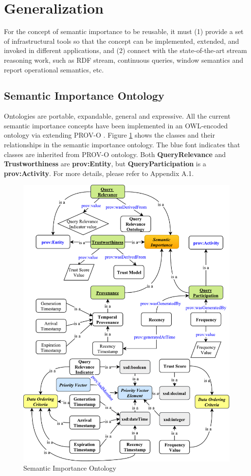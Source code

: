 \section{Generalization}
For the concept of semantic importance to be reusable, it must 
(1) provide a set of infrastructural tools so that the concept can be implemented, extended, and invoked in different applications, 
and (2) connect with the state-of-the-art stream reasoning work, such as RDF stream, continuous queries, window semantics and report operational semantics, etc.
%
\subsection{Semantic Importance Ontology}
Ontologies are portable, expandable, general and expressive.
All the current semantic importance concepts have been implemented in an OWL-encoded ontology via extending PROV-O \cite{lebo2013prov}.
Figure \ref{fig:6-sicr} shows the classes and their relationships in the semantic importance ontology. 
The blue font indicates that classes are inherited from PROV-O ontology. 
Both \textbf{QueryRelevance} and \textbf{Trustworthiness} are \textbf{prov:Entity}, but \textbf{QueryParticipation} is a \textbf{prov:Activity}.
For more details, please refer to Appendix A.1. 

\begin{figure}[!htbp]
    \centering
    \includegraphics[width=5in]{img/6-sicr.pdf}
    \caption{Semantic Importance Ontology}
    \label{fig:6-sicr}
\end{figure}
%
